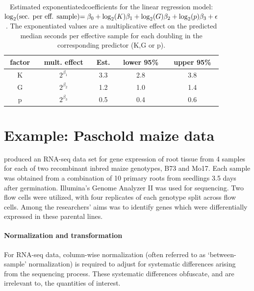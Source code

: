 {\begin{table}
\caption[Estimated exponentiated coefficients for the linear regression model: (model)]{\small Estimated exponentiatedcoefficients for the linear regression model: \\\hspace{\textwidth}\(\log_2$(sec. per eff. sample)$=\beta_0 + \log_2(K)\beta_1 + \log_2(G)\beta_2 + \log_2(p)\beta_3 + \epsilon\). The exponentiated values are a multiplicative effect on the predicted median seconds per effective sample for each doubling in the corresponding predictor (K,G or p).}
\vspace{0.5cm}
\label{tab:regression}
\centering
\begin{tabular}{ccccc}
  \hline
factor &mult. effect& Est. & lower 95\% & upper 95\% \\ 
  \hline
K & $2^{\beta_1}$ & 3.3 & 2.8 & 3.8 \\ 
G & $2^{\beta_2}$ & 1.2 & 1.0 & 1.4 \\ 
p & $2^{\beta_3}$ & 0.5 & 0.4 & 0.6 \\ 
   \hline
\end{tabular}
\end{table}


\section{Example: Paschold maize data}
\label{sec:analysis}
\citet{paschold} produced an RNA-seq data set for gene expression of root tissue from 4 samples for each of two recombinant inbred maize genotypes, B73 and Mo17. Each sample was obtained from a combination of 10 primary roots from seedlings 3.5 days after germination. Illumina's Genome Analyzer II was used for sequencing. Two flow cells were utilized, with four replicates of each genotype split across flow cells. Among the researchers' aims was to identify genes which were differentially expressed in these parental lines.

\paragraph{Normalization and transformation}
For RNA-seq data, column-wise normalization (often referred to as `between-sample' normalization) is required to adjust for systematic differences arising from the sequencing process. These systematic differences obfuscate, and are irrelevant to, the quantities of interest.

}
